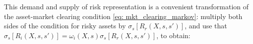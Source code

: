 This demand and supply of risk representation is a convenient transformation of the asset-market clearing condition \eqref{eq: mkt_clearing_markov}: multiply both sides of the condition for risky assets by $\sigma_s[R_r(X,s,s')]$, and use that $\sigma_s[R_{i}(X,s,s')] = \omega_{i}(X,s) \sigma_s[R_{r}(X,s,s')]$, to obtain:
    



